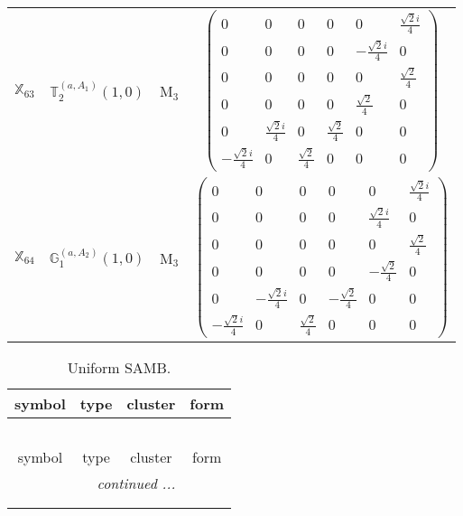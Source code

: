 \documentclass[fleqn,10pt,landscape]{article}
\begin{document}
\begin{itemize}
\begin{center}
\begin{longtable}{c|c|c|c}
$ \mathbb{X}_{63} $ & $\mathbb{T}_{2}^{(a,A_{1})}(1,0)$ & M$_{3}$ & $\begin{pmatrix} 0 & 0 & 0 & 0 & 0 & \frac{\sqrt{2} i}{4} \\ 0 & 0 & 0 & 0 & - \frac{\sqrt{2} i}{4} & 0 \\ 0 & 0 & 0 & 0 & 0 & \frac{\sqrt{2}}{4} \\ 0 & 0 & 0 & 0 & \frac{\sqrt{2}}{4} & 0 \\ 0 & \frac{\sqrt{2} i}{4} & 0 & \frac{\sqrt{2}}{4} & 0 & 0 \\ - \frac{\sqrt{2} i}{4} & 0 & \frac{\sqrt{2}}{4} & 0 & 0 & 0 \end{pmatrix}$ \\
$ \mathbb{X}_{64} $ & $\mathbb{G}_{1}^{(a,A_{2})}(1,0)$ & M$_{3}$ & $\begin{pmatrix} 0 & 0 & 0 & 0 & 0 & \frac{\sqrt{2} i}{4} \\ 0 & 0 & 0 & 0 & \frac{\sqrt{2} i}{4} & 0 \\ 0 & 0 & 0 & 0 & 0 & \frac{\sqrt{2}}{4} \\ 0 & 0 & 0 & 0 & - \frac{\sqrt{2}}{4} & 0 \\ 0 & - \frac{\sqrt{2} i}{4} & 0 & - \frac{\sqrt{2}}{4} & 0 & 0 \\ - \frac{\sqrt{2} i}{4} & 0 & \frac{\sqrt{2}}{4} & 0 & 0 & 0 \end{pmatrix}$ \\
\end{longtable}
\end{center}
\begin{center}
\renewcommand{\arraystretch}{1.3}
\begin{longtable}{c|c|c|c}
\caption{Uniform SAMB.}
 \\
 \hline \hline
symbol & type & cluster & form \\ \hline \endfirsthead

\multicolumn{3}{l}{\tablename\ \thetable{}} \\
 \hline \hline
symbol & type & cluster & form \\ \hline \endhead

 \hline \hline
\multicolumn{3}{r}{\footnotesize\it continued ...} \\ \endfoot

 \hline \hline
\multicolumn{3}{r}{} \\ \endlastfoot


\end{longtable}
\end{center}
\end{itemize}
\end{document}
